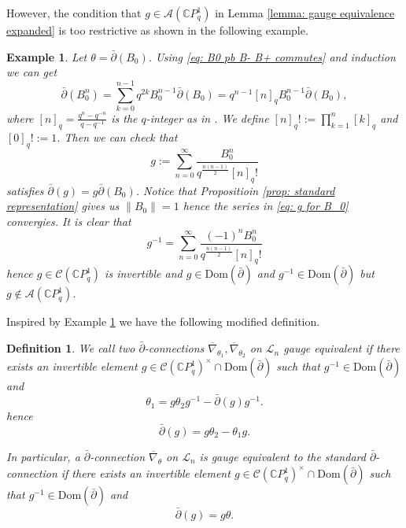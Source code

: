 \documentclass[12pt]{article}
\newtheorem{definition}{Definition}[section]
\newtheorem{example}{Example}
\numberwithin{equation}{section}
\def\Dom{{\mathrm {Dom}}}
\def\pb{\bar{\partial}}
\def\C{{\mathbb C}}
\def\A{\mathcal{A}}
\def\L{\mathcal{L}}
\begin{document}
However, the condition that $g\in \A(\C P^1_q)$ in Lemma \ref{lemma: gauge equivalence expanded} is too restrictive as shown in the following example.

\begin{example}\label{example: exp equation for B_0}
Let $\theta=\pb(B_0)$. Using \eqref{eq: B0 pb B- B+ commutes} and induction we can get
\begin{equation}\label{eq: pb of B_0^n}
    \pb(B_0^n)=\sum_{k=0}^{n-1}q^{2k}B_0^{n-1}\pb(B_0)=q^{n-1}[n]_{q}B_0^{n-1}\pb(B_0),
\end{equation}
where $[n]_{q}=\frac{q^{n}-q^{-n}}{q-q^{-1}}$ is the $q$-integer as in \cite[(3.1)]{khalkhali2011holomorphic}. We define $[n]_{q}!:=\prod_{k=1}^n [k]_{q}$ and $[0]_{q}!:=1$. Then we can check that 
\begin{equation}\label{eq: g for B_0}
g:=\sum_{n=0}^{\infty}\frac{B_0^n}{q^{\frac{n(n-1)}{2}}[n]_{q}!}
\end{equation}
satisfies $\pb(g)=g\pb(B_0)$. Notice that Propositioin \ref{prop: standard representation} gives us $\lVert B_0\rVert=1$ hence the series in \eqref{eq: g for B_0} convergies. It is clear that
$$
g^{-1}=\sum_{n=0}^{\infty}\frac{(-1)^n B_0^n}{q^{\frac{n(n-1)}{2}}[n]_{q}!}
$$
hence $g\in \mathcal{C}(\C P^1_q)$ is invertible and $g\in \Dom(\pb)$ and $g^{-1}\in \Dom(\pb)$ but $g\notin \A(\C P^1_q)$.
\end{example}

Inspired by Example \ref{example: exp equation for B_0} we have the following modified definition.

\begin{definition}\label{def: gauge equivalence}
     We call two $\pb$-connections $\overline{\nabla}_{\theta_1}, \overline{\nabla}_{\theta_2}$ on  $\L_n$   gauge equivalent if there exists an invertible element $g\in \mathcal{C}(\C P^1_q)^{\times}\cap \Dom(\pb)$ such that $g^{-1}\in \Dom(\pb)$ and
     $$
         \theta_1=g\theta_2 g^{-1}-\pb(g)g^{-1}.
    $$
     hence
      \begin{equation}\label{eq: gauge equivalence general}
        \pb(g)= g\theta_2 -\theta_1 g.
     \end{equation}

     In particular, a $\pb$-connection $\overline{\nabla}_{\theta}$ on  $\L_n$ is gauge equivalent to the standard $\pb$-connection if there exists an invertible element $g\in \mathcal{C}(\C P^1_q)^{\times}\cap \Dom(\pb)$ such that $g^{-1}\in \Dom(\pb)$ and
     \begin{equation}\label{eq: gauge equivalence to standard general}
        \pb(g)=g\theta.
     \end{equation}
\end{definition}
\end{document}
